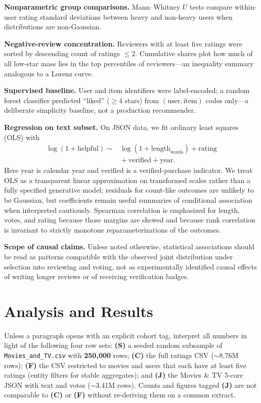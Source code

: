 \documentclass[conference]{IEEEtran}
\begin{document}
\textbf{Nonparametric group comparisons.} Mann--Whitney $U$ tests compare within-user rating standard deviations between heavy and non-heavy users when distributions are non-Gaussian.

\textbf{Negative-review concentration.} Reviewers with at least five ratings were sorted by descending count of ratings $\leq 2$. Cumulative shares plot how much of all low-star mass lies in the top percentiles of reviewers---an inequality summary analogous to a Lorenz curve.

\textbf{Supervised baseline.} User and item identifiers were label-encoded; a random forest classifier predicted ``liked'' ($\geq 4$ stars) from $(\text{user},\text{item})$ codes only---a deliberate simplicity baseline, not a production recommender.

\textbf{Regression on text subset.} On JSON data, we fit ordinary least squares (OLS) with
\begin{equation}
\label{eq:helpful_ols}
\begin{split}
\log(1+\text{helpful}) \sim {}& \log(1+\text{length}_{\text{words}}) + \text{rating} \\
&{} + \text{verified} + \mathrm{year}.
\end{split}
\end{equation}
Here $\mathrm{year}$ is calendar year and $\text{verified}$ is a verified-purchase indicator. We treat OLS as a transparent linear approximation on transformed scales rather than a fully specified generative model; residuals for count-like outcomes are unlikely to be Gaussian, but coefficients remain useful summaries of conditional association when interpreted cautiously. Spearman correlation is emphasized for length, votes, and rating because those margins are skewed and because rank correlation is invariant to strictly monotone reparameterizations of the outcomes.

\textbf{Scope of causal claims.} Unless noted otherwise, statistical associations should be read as patterns compatible with the observed joint distribution under selection into reviewing and voting, not as experimentally identified causal effects of writing longer reviews or of receiving verification badges.

\section{Analysis and Results}
\label{sec:analysis}

Unless a paragraph opens with an explicit cohort tag, interpret all numbers in light of the following four row sets: \textbf{(S)} a seeded random subsample of \texttt{Movies\_and\_TV.csv} with \textbf{250{,}000} rows; \textbf{(C)} the full ratings CSV ($\sim$8.76M rows); \textbf{(F)} the CSV restricted to movies and users that each have at least five ratings (entity filters for stable aggregates); and \textbf{(J)} the Movies \& TV 5-core JSON with text and votes ($\sim$3.41M rows). Counts and figures tagged \textbf{(J)} are not comparable to \textbf{(C)} or \textbf{(F)} without re-deriving them on a common extract.
\end{document}
